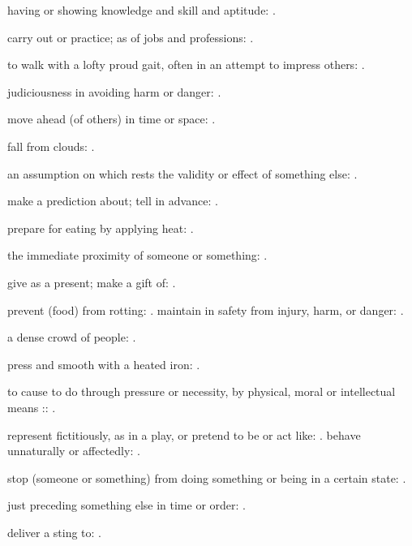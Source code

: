   having or showing knowledge and skill and aptitude: .

  carry out or practice; as of jobs and professions: .

  to walk with a lofty proud gait, often in an attempt to impress others: .

  judiciousness in avoiding harm or danger: .

  move ahead (of others) in time or space: .

  fall from clouds: .

  an assumption on which rests the validity or effect of something else: .

  make a prediction about; tell in advance: .

  prepare for eating by applying heat: .

  the immediate proximity of someone or something: .

  give as a present; make a gift of: .

  prevent (food) from rotting: . maintain in safety from injury, harm, or danger: .

  a dense crowd of people: .

  press and smooth with a heated iron: .

  to cause to do through pressure or necessity, by physical, moral or intellectual means :: .

  represent fictitiously, as in a play, or pretend to be or act like: . behave unnaturally or affectedly: .

  stop (someone or something) from doing something or being in a certain state: .

  just preceding something else in time or order: .

  deliver a sting to: .

